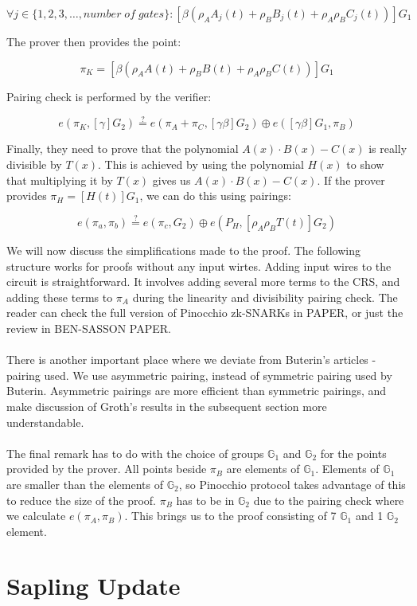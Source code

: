 $$\forall j \in \{1, 2, 3, \ldots, number\;of\;gates\} : [\beta(\rho_A A_j(t) + \rho_B B_j(t) + \rho_A \rho_B C_j(t))]G_1 $$

The prover then provides the point:

$$ \pi_{K} = [\beta(\rho_A A(t) + \rho_B B(t) + \rho_A \rho_B C(t))]G_1 $$

Pairing check is performed by the verifier:

$$ e(\pi_K, [\gamma]G_2) \stackrel{?}{=} e(\pi_A + \pi_C, [\gamma\beta]G_2) \oplus e([\gamma\beta]G_1, \pi_B) $$

Finally, they need to prove that the polynomial $A(x) \cdot B(x) - C(x)$ is really divisible by $T(x)$. This is achieved by using the polynomial $H(x)$ to show that multiplying it by $T(x)$ gives us $A(x) \cdot B(x) - C(x)$. If the prover provides $\pi_H = [H(t)]G_1$, we can do this using pairings:

$$ e(\pi_a, \pi_b) \stackrel{?}{=} e(\pi_c, G_2) \oplus e(P_H, [\rho_A \rho_B T(t)]G_2) $$

We will now discuss the simplifications made to the proof. The following structure works for proofs without any input wirtes. Adding input wires to the circuit is straightforward. It involves adding several more terms to the CRS, and adding these terms to $\pi_A$ during the linearity and divisibility pairing check. The reader can check the full version of Pinocchio zk-SNARKs in PAPER, or just the review in BEN-SASSON PAPER.\\
\\
There is another important place where we deviate from Buterin's articles - pairing used. We use asymmetric pairing, instead of symmetric pairing used by Buterin. Asymmetric pairings are more efficient than symmetric pairings, and make discussion of Groth's results in the subsequent section more understandable.\\
\\
The final remark has to do with the choice of groups $\mathbb{G}_1$ and $\mathbb{G}_2$ for the points provided by the prover. All points beside $\pi_B$ are elements of $\mathbb{G}_1$. Elements of $\mathbb{G}_1$ are smaller than the elements of $\mathbb{G}_2$, so Pinocchio protocol takes advantage of this to reduce the size of the proof. $\pi_B$ has to be in $\mathbb{G}_2$ due to the pairing check where we calculate $e(\pi_A, \pi_B)$. This brings us to the proof consisting of 7 $\mathbb{G}_1$ and 1 $\mathbb{G}_2$ element.

\section{Sapling Update}

